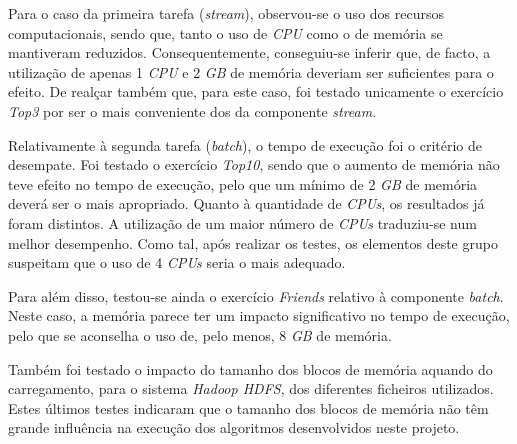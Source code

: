 \documentclass[a4paper]{report}
\begin{document}
    Para o caso da primeira tarefa (\textit{stream}), observou-se o uso dos recursos computacionais, sendo que, tanto o uso de \textit{CPU} como o de memória se mantiveram reduzidos.
    Consequentemente, conseguiu-se inferir que, de facto, a utilização de apenas 1 \textit{CPU} e 2 \textit{GB} de memória deveriam ser suficientes para o efeito.
    De realçar também que, para este caso, foi testado unicamente o exercício \textit{Top3} por ser o mais conveniente dos da componente \textit{stream}.

    Relativamente à segunda tarefa (\textit{batch}), o tempo de execução foi o critério de desempate.
    Foi testado o exercício \textit{Top10}, sendo que o aumento de memória não teve efeito no tempo de execução, pelo que um mínimo de 2 \textit{GB} de memória deverá ser o mais apropriado.
    Quanto à quantidade de \textit{CPUs}, os resultados já foram distintos. A utilização de um maior número de \textit{CPUs} traduziu-se num melhor desempenho. Como tal, após realizar os testes, os elementos deste grupo suspeitam que o uso de 4 \textit{CPUs} seria o mais adequado.
    
    Para além disso, testou-se ainda o exercício \textit{Friends} relativo à componente \textit{batch}. 
    Neste caso, a memória parece ter um impacto significativo no tempo de execução, pelo que se aconselha o uso de, pelo menos, 8 \textit{GB} de memória.

    Também foi testado o impacto do tamanho dos blocos de memória aquando do carregamento, para o sistema \textit{Hadoop HDFS}, dos diferentes ficheiros utilizados.
    Estes últimos testes indicaram que o tamanho dos blocos de memória não têm grande influência na execução dos algoritmos desenvolvidos neste projeto.
\end{document}
